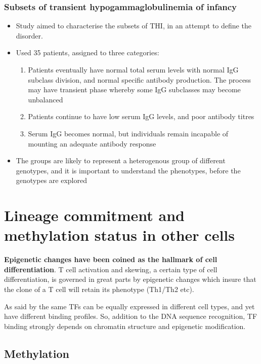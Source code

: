 \documentclass[12pt]{article}
\begin{document}
			\subsubsection{Subsets of transient hypogammaglobulinemia of infancy \citeauthor{Dalal98} \citeyear{Dalal98}}
				
				\begin{itemize}
					\item Study aimed to characterise the subsets of THI, in an attempt to define the disorder. 
					\item Used 35 patients, assigned to three categories:
					\begin{enumerate}
						\item Patients eventually have normal total serum levels with normal IgG subclass division, and normal specific antibody production. The process may have transient phase whereby some IgG subclasses may become unbalanced 
						\item Patients continue to have low serum IgG levels, and poor antibody titres
						\item Serum IgG becomes normal, but individuals remain incapable of mounting an adequate antibody response
					\end{enumerate}
					\item The groups are likely to represent a heterogenous group of different genotypes, and it is important to understand the phenotypes, before the genotypes are explored
				\end{itemize}
			
	\section{Lineage commitment and methylation status in other cells}
	
		{\bf Epigenetic changes have been coined as the hallmark of cell differentiation}. T cell activation and skewing, a certain type of cell differentiation, is governed in great parts by epigenetic changes which insure that the clone of a T cell will retain its phenotype (Th1/Th2 etc).
		
		As said by \citet{Choukrallah14} the same TFs can be equally expressed in different cell types, and yet have different binding profiles. So, addition to the DNA sequence recognition, TF binding strongly depends on chromatin structure and epigenetic modification.
	
		\subsection{Methylation}
		
\end{document}
